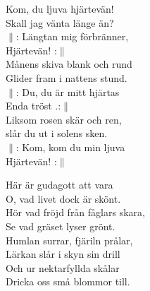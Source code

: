 \documentclass[a6paper, 10pt, twoside]{article}
\begin{document}
\noindent
\begin{center}
\end{center}
\begin{lyrics}
Kom, du ljuva hjärtevän!\\
Skall jag vänta länge än?\\
$\|$: Längtan mig förbränner,\\
Hjärtevän! :$\|$
\vspace{5pt}\\
Månens skiva blank och rund\\
Glider fram i nattens stund.\\
$\|$: Du, du är mitt hjärtas\\
Enda tröst .:$\|$
\vspace{5pt}\\
Liksom rosen skär och ren,\\
slår du ut i solens sken.\\
$\|$: Kom, kom du min ljuva\\
Hjärtevän! :$\|$
\end{lyrics}
\vspace{30pt}
\begin{center}
\end{center}
\begin{lyrics}
Här är gudagott att vara\\
O, vad livet dock är skönt.\\
Hör vad fröjd från fåglars skara,\\
Se vad gräset lyser grönt.\\
Humlan surrar, fjäriln prålar,\\
Lärkan slår i skyn sin drill\\
Och ur nektarfyllda skålar\\
Dricka oss små blommor till. 
\end{lyrics}
\end{document}
